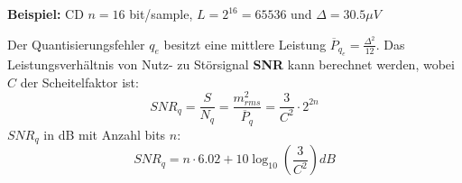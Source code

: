 \textbf{Beispiel:} CD
$n = 16$ bit/sample, $L=2^16 = 65536$ und $\Delta = 30.5\mu V$

Der Quantisierungsfehler $q_e$ besitzt eine mittlere Leistung $\overline{P}_{q_e} = \frac{\Delta^2}{12}$. Das Leistungsverhältnis von Nutz- zu Störsignal \textbf{SNR} kann berechnet werden, wobei $C$ der Scheitelfaktor ist:
\[
SNR_q = \frac{S}{N_q} = \frac{m_{rms}^2}{\overline{P}_q} = \frac{3}{C^2}\cdot2^{2n}
\]
$SNR_q$ in dB mit Anzahl bits $n$:
\[
SNR_q = n\cdot 6.02 + 10\log_{10}\left(\frac{3}{C^2}\right)dB
\]
